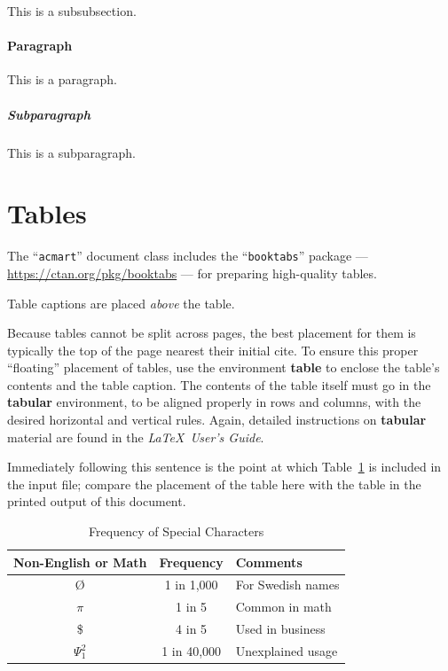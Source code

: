 \documentclass[sigconf,review]{acmart}
\begin{document}
This is a subsubsection.

\paragraph{Paragraph}

This is a paragraph.

\subparagraph{Subparagraph}

This is a subparagraph.

\section{Tables}

The ``\verb|acmart|'' document class includes the ``\verb|booktabs|''
package --- \url{https://ctan.org/pkg/booktabs} --- for preparing
high-quality tables.

Table captions are placed {\itshape above} the table.

Because tables cannot be split across pages, the best placement for
them is typically the top of the page nearest their initial cite.  To
ensure this proper ``floating'' placement of tables, use the
environment \textbf{table} to enclose the table's contents and the
table caption.  The contents of the table itself must go in the
\textbf{tabular} environment, to be aligned properly in rows and
columns, with the desired horizontal and vertical rules.  Again,
detailed instructions on \textbf{tabular} material are found in the
\textit{\LaTeX\ User's Guide}.

Immediately following this sentence is the point at which
Table~\ref{tab:freq} is included in the input file; compare the
placement of the table here with the table in the printed output of
this document.

\begin{table}
  \caption{Frequency of Special Characters}
  \label{tab:freq}
  \begin{tabular}{ccl}
    \toprule
    Non-English or Math&Frequency&Comments\\
    \midrule
    \O & 1 in 1,000& For Swedish names\\
    $\pi$ & 1 in 5& Common in math\\
    \$ & 4 in 5 & Used in business\\
    $\Psi^2_1$ & 1 in 40,000& Unexplained usage\\
  \bottomrule
\end{tabular}
\end{table}
\end{document}

